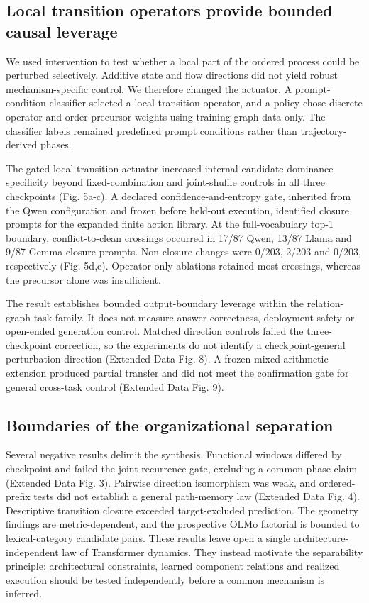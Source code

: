 \documentclass[12pt]{article}
\begin{document}
\subsection*{Local transition operators provide bounded causal leverage}

We used intervention to test whether a local part of the ordered process could be perturbed selectively. Additive state and flow directions did not yield robust mechanism-specific control. We therefore changed the actuator. A prompt-condition classifier selected a local transition operator, and a policy chose discrete operator and order-precursor weights using training-graph data only. The classifier labels remained predefined prompt conditions rather than trajectory-derived phases.

The gated local-transition actuator increased internal candidate-dominance specificity beyond fixed-combination and joint-shuffle controls in all three checkpoints (Fig. 5a-c). A declared confidence-and-entropy gate, inherited from the Qwen configuration and frozen before held-out execution, identified closure prompts for the expanded finite action library. At the full-vocabulary top-1 boundary, conflict-to-clean crossings occurred in 17/87 Qwen, 13/87 Llama and 9/87 Gemma closure prompts. Non-closure changes were 0/203, 2/203 and 0/203, respectively (Fig. 5d,e). Operator-only ablations retained most crossings, whereas the precursor alone was insufficient.

The result establishes bounded output-boundary leverage within the relation-graph task family. It does not measure answer correctness, deployment safety or open-ended generation control. Matched direction controls failed the three-checkpoint correction, so the experiments do not identify a checkpoint-general perturbation direction (Extended Data Fig. 8). A frozen mixed-arithmetic extension produced partial transfer and did not meet the confirmation gate for general cross-task control (Extended Data Fig. 9).

\subsection*{Boundaries of the organizational separation}

Several negative results delimit the synthesis. Functional windows differed by checkpoint and failed the joint recurrence gate, excluding a common phase claim (Extended Data Fig. 3). Pairwise direction isomorphism was weak, and ordered-prefix tests did not establish a general path-memory law (Extended Data Fig. 4). Descriptive transition closure exceeded target-excluded prediction. The geometry findings are metric-dependent, and the prospective OLMo factorial is bounded to lexical-category candidate pairs. These results leave open a single architecture-independent law of Transformer dynamics. They instead motivate the separability principle: architectural constraints, learned component relations and realized execution should be tested independently before a common mechanism is inferred.
\end{document}
